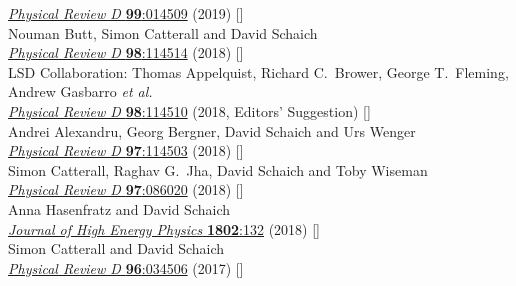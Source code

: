 \begin{spacelist}
\begin{revnumerate}
      \href{https://doi.org/10.1103/PhysRevD.99.014509}{\textit{Physical Review D} \textbf{99}:014509} (2019) []
    \pagebreakitem
       \\
      Nouman Butt, Simon Catterall and David Schaich \\
      \href{https://doi.org/10.1103/PhysRevD.98.114514}{\textit{Physical Review D} \textbf{98}:114514} (2018) []
    \pagebreakitem
       \\
      LSD Collaboration: Thomas Appelquist, Richard C.~Brower, George T.~Fleming, Andrew Gasbarro \textit{et al.} \\ %
      \href{https://doi.org/10.1103/PhysRevD.98.114510}{\textit{Physical Review D} \textbf{98}:114510} (2018, Editors' Suggestion) []
    \pagebreakitem
       \\
      Andrei Alexandru, Georg Bergner, David Schaich and Urs Wenger \\
      \href{https://doi.org/10.1103/PhysRevD.97.114503}{\textit{Physical Review D} \textbf{97}:114503} (2018) []
    \pagebreakitem
       \\
      Simon Catterall, Raghav G.~Jha, David Schaich and Toby Wiseman \\
      \href{https://doi.org/10.1103/PhysRevD.97.086020}{\textit{Physical Review D} \textbf{97}:086020} (2018) []
    \pagebreakitem
       \\
      Anna Hasenfratz and David Schaich \\
      \href{https://doi.org/10.1007/JHEP02(2018)132}{\textit{Journal of High Energy Physics} \textbf{1802}:132} (2018) []
    \pagebreakitem
       \\
      Simon Catterall and David Schaich \\
      \href{https://doi.org/10.1103/PhysRevD.96.034506}{\textit{Physical Review D} \textbf{96}:034506} (2017) []
    \pagebreakitem

\end{revnumerate}
\end{spacelist}
